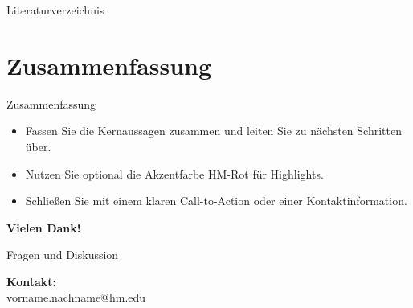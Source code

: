 \documentclass[aspectratio=169,10pt]{beamer}
\begin{document}
\begin{frame}[allowframebreaks]{Literaturverzeichnis}
\printbibliography[heading=none]
\end{frame}

\section{Zusammenfassung}
\begin{frame}{Zusammenfassung}
\begin{itemize}
  \item Fassen Sie die Kernaussagen zusammen und leiten Sie zu nächsten Schritten über.
  \item Nutzen Sie optional die Akzentfarbe \textcolor{HMRed}{HM-Rot} für Highlights.
  \item Schließen Sie mit einem klaren Call-to-Action oder einer Kontaktinformation.
\end{itemize}
\end{frame}

\begin{frame}[plain]
\begin{center}
  \vspace{2cm}
  {\Huge \textbf{Vielen Dank!}}
  
  \vspace{1cm}
  {\Large Fragen und Diskussion}
  
  \vspace{1.5cm}
  \textbf{Kontakt:}\\
  vorname.nachname@hm.edu
\end{center}
\end{frame}
\end{document}
